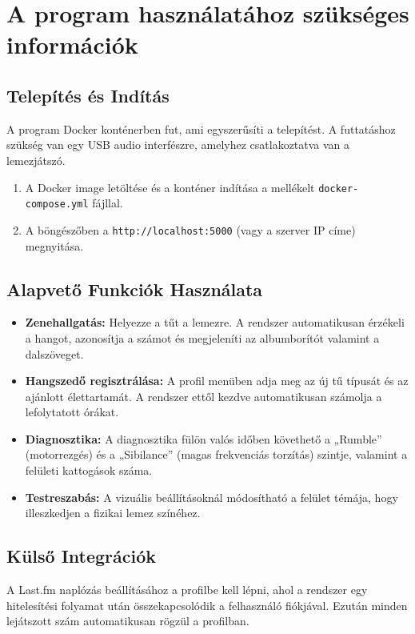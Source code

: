 \documentclass[12pt,a4paper,hungarian]{report}
\begin{document}
\section{A program használatához szükséges információk}

\subsection{Telepítés és Indítás}
A program Docker konténerben fut, ami egyszerűsíti a telepítést. A futtatáshoz szükség van egy USB audio interfészre, amelyhez csatlakoztatva van a lemezjátszó.
\begin{enumerate}
    \item A Docker image letöltése és a konténer indítása a mellékelt \texttt{docker-compose.yml} fájllal.
    \item A böngészőben a \texttt{http://localhost:5000} (vagy a szerver IP címe) megnyitása.
\end{enumerate}

\subsection{Alapvető Funkciók Használata}
\begin{itemize}
    \item \textbf{Zenehallgatás:} Helyezze a tűt a lemezre. A rendszer automatikusan érzékeli a hangot, azonosítja a számot és megjeleníti az albumborítót valamint a dalszöveget.
    \item \textbf{Hangszedő regisztrálása:} A profil menüben adja meg az új tű típusát és az ajánlott élettartamát. A rendszer ettől kezdve automatikusan számolja a lefolytatott órákat.
    \item \textbf{Diagnosztika:} A diagnosztika fülön valós időben követhető a „Rumble” (motorrezgés) és a „Sibilance” (magas frekvenciás torzítás) szintje, valamint a felületi kattogások száma.
    \item \textbf{Testreszabás:} A vizuális beállításoknál módosítható a felület témája, hogy illeszkedjen a fizikai lemez színéhez.
\end{itemize}

\subsection{Külső Integrációk}
A Last.fm naplózás beállításához a profilbe kell lépni, ahol a rendszer egy hitelesítési folyamat után összekapcsolódik a felhasználó fiókjával. Ezután minden lejátszott szám automatikusan rögzül a profilban.
\end{document}
